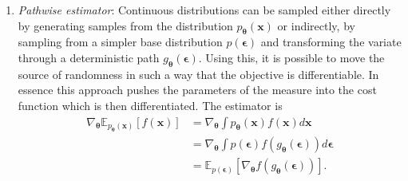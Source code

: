 \begin{enumerate}
	\item \emph{Pathwise estimator}: Continuous distributions can be sampled either directly by generating samples from the distribution $p_{\boldsymbol{\theta}}(\mathbf{x})$ or indirectly, by sampling from a simpler base distribution $p(\boldsymbol{\epsilon})$ and transforming the variate through a deterministic path $g_{\boldsymbol{\theta}}(\boldsymbol{\epsilon})$. Using this, it is possible to move the source of randomness in such a way that the objective is differentiable. In essence this approach pushes the parameters of the measure into the cost function which is then differentiated. The estimator is
	\begin{equation}
		\begin{aligned}
			\nabla_{\boldsymbol{\theta}} \mathbb{E}_{p_{\boldsymbol{\theta}}(\mathbf{x})}[f(\mathbf{x})] 
			&=\nabla_{\boldsymbol{\theta}} \int p_{\boldsymbol{\theta}}(\mathbf{x}) f(\mathbf{x}) d \mathbf{x} \\
			&= \nabla_{\boldsymbol{\theta}} \int p(\boldsymbol{\epsilon}) f(g_{\boldsymbol{\theta}}(\boldsymbol{\epsilon})) d \boldsymbol{\epsilon} \\
			&= \mathbb{E}_{p(\boldsymbol{\epsilon})}\left[\nabla_{\boldsymbol{\theta}} f(g_{\boldsymbol{\theta}}(\boldsymbol{\epsilon}))\right].
		\end{aligned}
	\end{equation}
	\begin{figure}
		\centering

\end{figure}
\end{enumerate}
